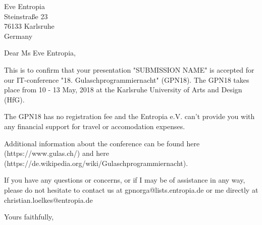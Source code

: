 \documentclass[%
   fontsize=10pt,%
   paper=a4,%
   enlargefirstpage=on,%
   pagenumber=headright,%
   headsepline=on,%
   parskip=half,%
   fromalign=right,%
   fromphone=on,%
   fromrule=off,%
   fromfax=off,%
   fromemail=on,%
   fromurl=on,%
   fromlogo=on,%
   addrfield=on,%
   backaddress=on,%
   subject=beforeopening,%
   locfield=wide,%
   foldmarks=on,%
   numericaldate=off,%
   refline=narrow,%
   draft=false%
]{scrlttr2}
\renewcommand*{\familydefault}{\ttdefault}
\begin{document}
 \begin{letter}{Eve Entropia
\\ Steinstraße 23
\\ 76133 Karlsruhe
\\ Germany
}

\opening{Dear Ms Eve Entropia,}
\renewcommand*{\familydefault}{\ttdefault}

This is to confirm that your presentation "SUBMISSION NAME" is accepted for our IT-conference "18. Gulaschprogrammiernacht" (GPN18). The GPN18 takes place from 10 - 13 May, 2018 at the Karlsruhe University of Arts and Design (HfG).

The GPN18 has no registration fee and the Entropia e.V. can't provide you with any financial support for travel or accomodation expenses.

Additional information about the conference can be found here (https://www.gulas.ch/) and here (https://de.wikipedia.org/wiki/Gulaschprogrammiernacht).

If you have any questions or concerns, or if I may be of assistance in any way, please do not hesitate to contact us at gpnorga@lists.entropia.de or me directly at christian.loelkes@entropia.de


\closing{Yours faithfully,}
\end{letter}
\end{document}
